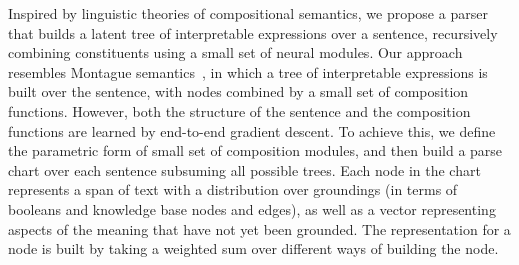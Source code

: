 \documentclass[main.tex]{subfiles}
\begin{document}
Inspired by linguistic theories of compositional semantics, we propose a parser that builds a latent tree of interpretable expressions over a sentence, recursively combining constituents using a small set of neural modules. %
Our approach resembles Montague semantics~\cite{montague-semantics}, in which a tree of interpretable expressions is built over the sentence, with nodes combined by a small set of composition functions. %
However, both the structure of the sentence and the composition functions are learned by end-to-end gradient descent. To achieve this, we define the parametric form of small set of composition modules, and then build a parse chart over each sentence subsuming all possible trees. Each node in the chart represents a span of text with a distribution over groundings (in terms of booleans and knowledge base nodes and edges), as well as a vector representing aspects of the meaning that have not yet been grounded. The representation for a node is built by taking a weighted sum over different ways of building the node. %
\end{document}
